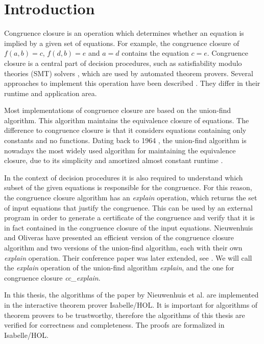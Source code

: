 
\chapter{Introduction}\label{chapter:introduction}

Congruence closure is an operation which determines whether an equation is implied by a given set of equations.
For example, the congruence closure of $f(a,b) = c$, $f(d,b) = e$ and $a = d$ contains the equation $c = e$.
Congruence closure is a central part of decision procedures, such as satisfiability modulo theories (SMT) solvers \cite{z3}, which are used by automated theorem provers.
Several approaches to implement this operation have been described \cite{congruenceclosure-og2,congruenceclosure-og,congruenceclosure-og3,Nieuwenhuis}.
They differ in their runtime and application area.


Most implementations of congruence closure are based on the union-find algorithm. This algorithm maintains the equivalence closure of equations. The difference to congruence closure is that it considers equations containing only constants and no functions.
Dating back to 1964 \cite{unionfind-og}, the union-find algorithm is nowadays the most widely used algorithm for maintaining the equivalence closure, due to its simplicity and amortized almost constant runtime \cite{Tarjan}.

In the context of decision procedures it is also required to understand which subset of the given equations is responsible for the congruence. For this reason, the congruence closure algorithm has an \emph{explain} operation, which returns the set of input equations that justify the congruence.
This can be used by an external program in order to generate a certificate of the congruence and verify that it is in fact contained in the congruence closure of the input equations.
Nieuwenhuis and Oliveras have presented an efficient version of the congruence closure algorithm and two versions of the union-find algorithm, each with their own \emph{explain} operation. Their conference paper \cite{Nieuwenhuis} was later extended, see \cite{Nieuwenhuis2}.
We will call the \emph{explain} operation of the union-find algorithm \emph{explain}, and the one for congruence closure \emph{cc\_explain}.

In this thesis, the algorithms of the paper by Nieuwenhuis et al. \cite{Nieuwenhuis} are implemented in the interactive theorem prover Isabelle/HOL.
It is important for algorithms of theorem provers to be trustworthy, therefore the algorithms of this thesis are verified for correctness and completeness.
The proofs are formalized in Isabelle/HOL.

